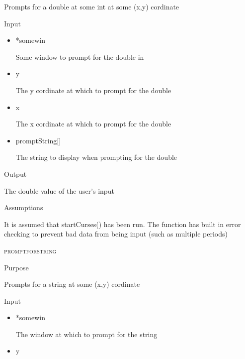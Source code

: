 \documentclass[pdftex, 11pt]{article}
\begin{document}
\begin{description}
\begin{description}
				Prompts for a double at some int at some (x,y) cordinate

			\item{Input}

				\begin{itemize}

					\item{*somewin}

						Some window to prompt for the double in

					\item{y}

						The y cordinate at which to prompt
						for the double

					\item{x} 

						The x cordinate at which to prompt
						for the double

					\item{promptString[]}

						The string to display when prompting for
						the double
						
				\end{itemize}



			\item{Output}

				The double value of the user's input

			\item{Assumptions}

				It is assumed that startCurses() has been run.
				The function has built in error checking to prevent
				bad data from being input (such as multiple periods)

		\end{description}


	\item{\textsc{promptforstring}}
		\begin{description}
			\item{Purpose}

				Prompts for a string at some (x,y) cordinate

			\item{Input}

				\begin{itemize}

					\item{*somewin}

						The window at which to prompt
						for the string

					\item{y}


\end{itemize}
\end{description}
\end{description}
\end{document}
